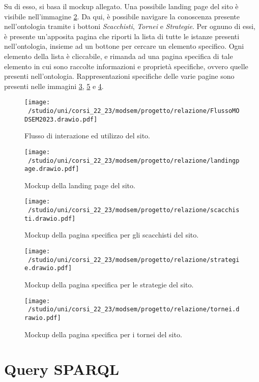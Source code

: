 \documentclass[12pt]{book}
\begin{document}
Su di esso, si basa il mockup allegato. Una possibile landing page del
sito è visibile nell'immagine \ref{fig:landing}. Da qui, è possibile
navigare la conoscenza presente nell'ontologia tramite i bottoni
\textit{Scacchisti}, \textit{Tornei} e \textit{Strategie}. Per ognuno
di essi, è presente un'apposita pagina che riporti la lista di tutte
le istanze presenti nell'ontologia, insieme ad un bottone per cercare
un elemento specifico. Ogni elemento della lista è cliccabile, e
rimanda ad una pagina specifica di tale elemento in cui sono raccolte
informazioni e proprietà specifiche, ovvero quelle presenti
nell'ontologia. Rappresentazioni specifiche delle varie pagine sono
presenti nelle immagini \ref{fig:scacchisti}, \ref{fig:tornei} e \ref{fig:strategie}.

\begin{figure}[h]
  \caption{Flusso di interazione ed utilizzo del sito.}
  \centering
  \label{fig:flusso}
  \texttt{[image: ~/studio/uni/corsi\_22\_23/modsem/progetto/relazione/FlussoMODSEM2023.drawio.pdf]}
\end{figure}

\begin{figure}[h]
  \caption{Mockup della landing page del sito.}
  \centering
  \label{fig:landing}
  \texttt{[image: ~/studio/uni/corsi\_22\_23/modsem/progetto/relazione/landingpage.drawio.pdf]}
\end{figure} 

\begin{figure}[h]
  \caption{Mockup della pagina specifica per gli scacchisti del sito.}
  \centering
\label{fig:scacchisti}
  \texttt{[image: ~/studio/uni/corsi\_22\_23/modsem/progetto/relazione/scacchisti.drawio.pdf]}
\end{figure} 

\begin{figure}[h]
  \caption{Mockup della pagina specifica per le strategie del sito.}
  \centering
\label{fig:strategie}
  \texttt{[image: ~/studio/uni/corsi\_22\_23/modsem/progetto/relazione/strategie.drawio.pdf]}
\end{figure} 


\begin{figure}[h]
  \caption{Mockup della pagina specifica per i tornei del sito.}
  \centering
\label{fig:tornei}
  \texttt{[image: ~/studio/uni/corsi\_22\_23/modsem/progetto/relazione/tornei.drawio.pdf]}
\end{figure} 

\chapter{Query SPARQL}
\end{document}
